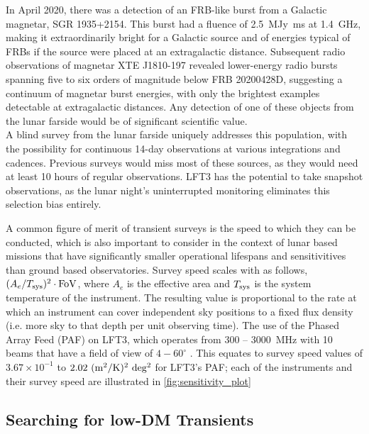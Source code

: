 In April 2020, there was a detection of an FRB-like burst from a Galactic magnetar, SGR 1935+2154. This burst had a fluence of 2.5~MJy~ms at 1.4~GHz, making it extraordinarily bright for a Galactic source and of energies typical of FRBs if the source were placed at an extragalactic distance. Subsequent radio observations of magnetar XTE J1810-197 revealed lower-energy radio bursts spanning five to six orders of magnitude below FRB 20200428D, suggesting a continuum of magnetar burst energies, with only the brightest examples detectable at extragalactic distances. Any detection of one of these objects from the lunar farside would be of significant scientific value. \\ 

A blind survey from the lunar farside uniquely addresses this population, with the possibility for continuous 14-day observations at various integrations and cadences. Previous surveys would miss most of these sources, as they would need at least 10 hours of regular observations. LFT3 has the potential to take snapshot observations, as the lunar night's uninterrupted monitoring eliminates this selection bias entirely. 

A common figure of merit of transient surveys is the speed to which they can be conducted, which is also important to consider in the context of lunar based missions that have significantly smaller operational lifespans and sensitivitives than ground based observatories. Survey speed scales with as follows, $(A_e/T_{\rm sys})^2 \cdot \rm FoV$, where $A_e$ is the effective area and $T_{\rm sys}$ is the system temperature of the instrument. The resulting value is proportional to the rate at which an instrument can cover independent sky positions to a fixed flux density (i.e. more sky to that depth per unit observing time). The use of the Phased Array Feed (PAF) on LFT3, which operates from 300 -- 3000~MHz with 10 beams that have a field of view of $4-60^\circ$ . This equates to survey speed values of $3.67 \times 10^{-1}$ to $2.02 \ \rm (m^2/K)^2 \ deg^2$ for LFT3's PAF; each of the instruments and their survey speed are illustrated in \cref{fig:sensitivity_plot}




\subsection{Searching for low-DM Transients}

